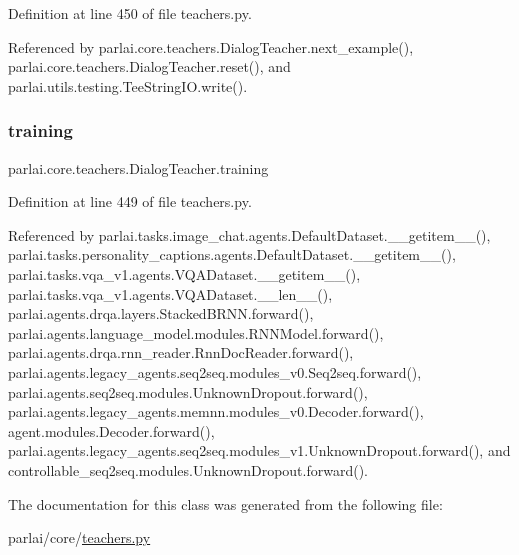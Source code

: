 Definition at line 450 of file teachers.\+py.



Referenced by parlai.\+core.\+teachers.\+Dialog\+Teacher.\+next\+\_\+example(), parlai.\+core.\+teachers.\+Dialog\+Teacher.\+reset(), and parlai.\+utils.\+testing.\+Tee\+String\+I\+O.\+write().

\mbox{\label{classparlai_1_1core_1_1teachers_1_1DialogTeacher_aaca26d863c30e54b4612539843f20b49}} 
\subsubsection{\texorpdfstring{training}{training}}
{\footnotesize\ttfamily parlai.\+core.\+teachers.\+Dialog\+Teacher.\+training}



Definition at line 449 of file teachers.\+py.



Referenced by parlai.\+tasks.\+image\+\_\+chat.\+agents.\+Default\+Dataset.\+\_\+\+\_\+getitem\+\_\+\+\_\+(), parlai.\+tasks.\+personality\+\_\+captions.\+agents.\+Default\+Dataset.\+\_\+\+\_\+getitem\+\_\+\+\_\+(), parlai.\+tasks.\+vqa\+\_\+v1.\+agents.\+V\+Q\+A\+Dataset.\+\_\+\+\_\+getitem\+\_\+\+\_\+(), parlai.\+tasks.\+vqa\+\_\+v1.\+agents.\+V\+Q\+A\+Dataset.\+\_\+\+\_\+len\+\_\+\+\_\+(), parlai.\+agents.\+drqa.\+layers.\+Stacked\+B\+R\+N\+N.\+forward(), parlai.\+agents.\+language\+\_\+model.\+modules.\+R\+N\+N\+Model.\+forward(), parlai.\+agents.\+drqa.\+rnn\+\_\+reader.\+Rnn\+Doc\+Reader.\+forward(), parlai.\+agents.\+legacy\+\_\+agents.\+seq2seq.\+modules\+\_\+v0.\+Seq2seq.\+forward(), parlai.\+agents.\+seq2seq.\+modules.\+Unknown\+Dropout.\+forward(), parlai.\+agents.\+legacy\+\_\+agents.\+memnn.\+modules\+\_\+v0.\+Decoder.\+forward(), agent.\+modules.\+Decoder.\+forward(), parlai.\+agents.\+legacy\+\_\+agents.\+seq2seq.\+modules\+\_\+v1.\+Unknown\+Dropout.\+forward(), and controllable\+\_\+seq2seq.\+modules.\+Unknown\+Dropout.\+forward().



The documentation for this class was generated from the following file\+:\begin{DoxyCompactItemize}
\item 
parlai/core/\hyperlink{teachers_8py}{teachers.\+py}\end{DoxyCompactItemize}
